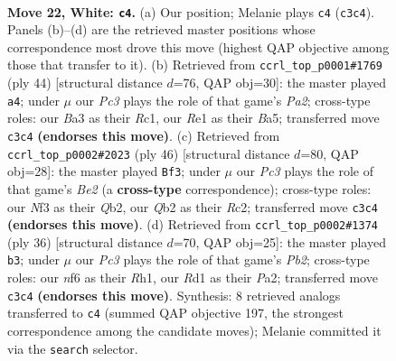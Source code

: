 \documentclass[11pt]{article}
\begin{document}
\clearpage

\begin{figure}[p]\centering
\begin{subfigure}{0.46\textwidth}\centering
\resizebox{\linewidth}{!}{%
\newchessgame
\chessboard[
  setfen={rnbqr1k1/5p2/1p2pnp1/7p/p2P4/B1PB1NPP/PQ3P2/3RR1K1 w - - 7 22},
  showmover=false,
  pgfstyle=straightmove, color=movearrow, markmove={c3-c4}
]}
\caption{}
\end{subfigure}\hfill
\begin{subfigure}{0.46\textwidth}\centering
\resizebox{\linewidth}{!}{%
\newchessgame
\chessboard[
  setfen={2r3k1/p2r1pb1/3qpnp1/BPp4p/2Q2P1P/3BP3/P3KP2/2R4R w - - 3 23},
  showmover=false,
  pgfstyle=straightmove, color=movearrow, markmove={a2-a4}
]}
\caption{}
\end{subfigure}
\\[4pt]
\begin{subfigure}{0.46\textwidth}\centering
\resizebox{\linewidth}{!}{%
\newchessgame
\chessboard[
  setfen={r2r2k1/1b3p2/1q4pp/pPnp4/2pN4/P3P2P/1QR1BPP1/3R2K1 w - - 3 24},
  showmover=false,
  pgfstyle=straightmove, color=movearrow, markmove={e2-f3}
]}
\caption{}
\end{subfigure}\hfill
\begin{subfigure}{0.46\textwidth}\centering
\resizebox{\linewidth}{!}{%
\newchessgame
\chessboard[
  setfen={rq2r1k1/p4pb1/2p1n1p1/2B1p2p/4N2P/2Q2P2/PPP3P1/2KR3R w - - 2 19},
  showmover=false,
  pgfstyle=straightmove, color=movearrow, markmove={b2-b3}
]}
\caption{}
\end{subfigure}
\caption{\textbf{Move 22, White: \texttt{c4}.} (a) Our position; Melanie plays \texttt{c4} (\texttt{c3c4}). Panels (b)--(d) are the retrieved master positions whose correspondence most drove this move (highest QAP objective among those that transfer to it). (b) Retrieved from \texttt{ccrl\_top\_p0001\#1769} (ply 44) [structural distance $d$=76, QAP obj=30]: the master played \texttt{a4}; under $\mu$ our \emph{Pc3} plays the role of that game's \emph{Pa2}; cross-type roles: our \emph{B}a3 as their \emph{R}c1, our \emph{R}e1 as their \emph{B}a5; transferred move \texttt{c3c4} \textbf{(endorses this move)}. (c) Retrieved from \texttt{ccrl\_top\_p0002\#2023} (ply 46) [structural distance $d$=80, QAP obj=28]: the master played \texttt{Bf3}; under $\mu$ our \emph{Pc3} plays the role of that game's \emph{Be2} (a \textbf{cross-type} correspondence); cross-type roles: our \emph{N}f3 as their \emph{Q}b2, our \emph{Q}b2 as their \emph{R}c2; transferred move \texttt{c3c4} \textbf{(endorses this move)}. (d) Retrieved from \texttt{ccrl\_top\_p0002\#1374} (ply 36) [structural distance $d$=70, QAP obj=25]: the master played \texttt{b3}; under $\mu$ our \emph{Pc3} plays the role of that game's \emph{Pb2}; cross-type roles: our \emph{n}f6 as their \emph{R}h1, our \emph{R}d1 as their \emph{P}a2; transferred move \texttt{c3c4} \textbf{(endorses this move)}. Synthesis: 8 retrieved analogs transferred to \texttt{c4} (summed QAP objective 197, the strongest correspondence among the candidate moves); Melanie committed it via the \texttt{search} selector.}
\label{fig:thought-m42}
\end{figure}
\end{document}
